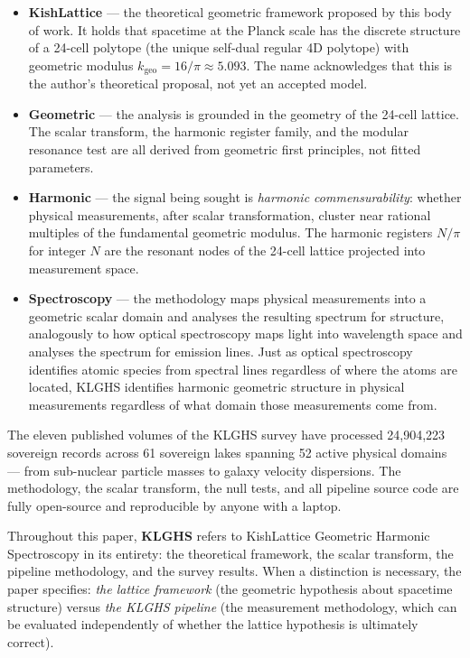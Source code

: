 \documentclass[11pt, letterpaper, openany]{book}
\begin{document}
\begin{itemize}
    \item \textbf{KishLattice} --- the theoretical geometric framework
    proposed by this body of work. It holds that spacetime at the Planck
    scale has the discrete structure of a 24-cell polytope (the unique
    self-dual regular 4D polytope) with geometric modulus
    $k_\text{geo} = 16/\pi \approx 5.093$. The name acknowledges that
    this is the author's theoretical proposal, not yet an accepted model.

    \item \textbf{Geometric} --- the analysis is grounded in the
    geometry of the 24-cell lattice. The scalar transform, the
    harmonic register family, and the modular resonance test are all
    derived from geometric first principles, not fitted parameters.

    \item \textbf{Harmonic} --- the signal being sought is
    \textit{harmonic commensurability}: whether physical measurements,
    after scalar transformation, cluster near rational multiples of the
    fundamental geometric modulus. The harmonic registers $N/\pi$ for
    integer $N$ are the resonant nodes of the 24-cell lattice projected
    into measurement space.

    \item \textbf{Spectroscopy} --- the methodology maps physical
    measurements into a geometric scalar domain and analyses the
    resulting spectrum for structure, analogously to how optical
    spectroscopy maps light into wavelength space and analyses the
    spectrum for emission lines. Just as optical spectroscopy identifies
    atomic species from spectral lines regardless of where the atoms
    are located, KLGHS identifies harmonic geometric structure in
    physical measurements regardless of what domain those measurements
    come from.
\end{itemize}

The eleven published volumes of the KLGHS survey have processed
24,904,223 sovereign records across 61 sovereign lakes spanning
52 active physical domains --- from sub-nuclear particle masses to galaxy
velocity dispersions. The methodology, the scalar transform, the null
tests, and all pipeline source code are fully open-source and
reproducible by anyone with a laptop.

\medskip
\noindent Throughout this paper, \textbf{KLGHS} refers to
KishLattice Geometric Harmonic Spectroscopy in its entirety: the
theoretical framework, the scalar transform, the pipeline methodology,
and the survey results. When a distinction is necessary, the paper
specifies: \textit{the lattice framework} (the geometric hypothesis
about spacetime structure) versus \textit{the KLGHS pipeline}
(the measurement methodology, which can be evaluated independently
of whether the lattice hypothesis is ultimately correct).
\end{document}
